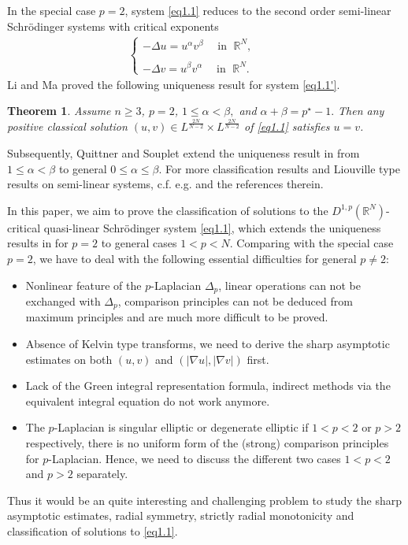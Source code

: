 \documentclass[12pt]{amsart}
\newtheorem{thm}{Theorem}[section]
\theoremstyle{definition}
\theoremstyle{remark}
\theoremstyle{conclusion}
\theoremstyle{conjecture}
\numberwithin{equation}{section}
\newcommand{\R}{\mathbb{R}}
\begin{document}
In the special case $p=2$, system \eqref{eq1.1} reduces to the second order semi-linear Schr\"{o}dinger systems with critical exponents
\begin{align}\label{eq1.1'}
\left\{ \begin{array}{ll} \displaystyle
-\Delta u = u^{\alpha}v^{\beta}  \, \ \ \ \ \ \mbox{in}\,\ \ \R^N, \\ \\
-\Delta v = u^{\beta}v^{\alpha}  \,\  \ \ \ \ \mbox{in}\,\ \ \R^N.
\end{array}
\right.\hspace{1cm}
\end{align}
Li and Ma \cite{LM} proved the following uniqueness result for system \eqref{eq1.1'}.
\begin{thm}
    Assume $n\geq 3$, $p=2$, $1\leq \alpha < \beta,$ and $\alpha+\beta =p^\star-1.$ Then any positive classical solution $(u,v)\in L^{\frac{2N}{N-2}}\times L^{\frac{2N}{N-2}}$ of \eqref{eq1.1} satisfies $u=v$.
\end{thm}
Subsequently, Quittner and Souplet \cite{QS} extend the uniqueness result in \cite{LM} from $1\leq \alpha < \beta$ to general $0\leq \alpha \leq \beta$. For more classification results and Liouville type results on semi-linear systems, c.f. e.g. \cite{CDQ0,CGP,CDQ,DQ1,DQ0,Di,LLW,LYZ,SZ,Soup} and the references therein.

In this paper, we aim to prove the classification of solutions to the $D^{1,p}(\mathbb{R}^{N})$-critical quasi-linear Schr\"{o}dinger system \eqref{eq1.1}, which extends the uniqueness results in \cite{LM,QS} for $p=2$ to general cases $1<p<N$. Comparing with the special case $p=2$, we have to deal with the following essential difficulties for general $p\neq2$:
\begin{itemize}
  \item Nonlinear feature of the $p$-Laplacian $\Delta_p$, linear operations can not be exchanged with $\Delta_p$, comparison principles can not be deduced from maximum principles and are much more difficult to be proved.
  \item Absence of Kelvin type transforms, we need to derive the sharp asymptotic estimates on both $(u,v)$ and $(|\nabla u|,|\nabla v|)$ first.
  \item Lack of the Green integral representation formula, indirect methods via the equivalent integral equation do not work anymore.
  \item The $p$-Laplacian is singular elliptic or degenerate elliptic if $1<p<2$ or $p>2$ respectively, there is no uniform form of the (strong) comparison principles for $p$-Laplacian. Hence, we need to discuss the different two cases $1<p<2$ and $p>2$ separately.
\end{itemize}
Thus it would be an quite interesting and challenging problem to study the sharp asymptotic estimates, radial symmetry, strictly radial monotonicity and classification of solutions to \eqref{eq1.1}.
\end{document}
